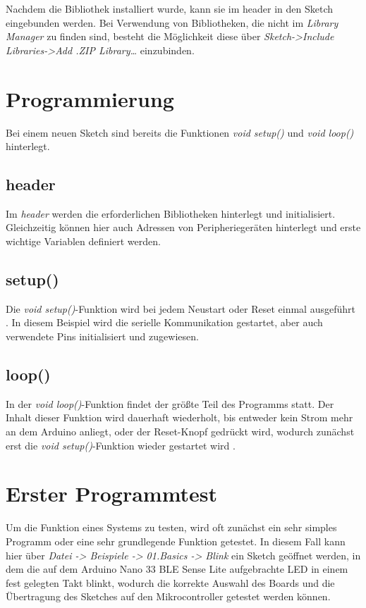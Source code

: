 Nachdem die Bibliothek installiert wurde, kann sie im header in den Sketch eingebunden werden.
Bei Verwendung von Bibliotheken, die nicht im \textit{Library Manager} zu finden sind, besteht die Möglichkeit diese über \textit{Sketch->Include Libraries->Add .ZIP Library…} einzubinden.

\section{Programmierung}
Bei einem neuen Sketch sind bereits die Funktionen \textit{void setup()} und \textit{void loop()} hinterlegt.

\subsection{header}
Im \textit{header} werden die erforderlichen Bibliotheken hinterlegt und initialisiert. Gleichzeitig können hier auch Adressen von Peripheriegeräten hinterlegt und erste wichtige Variablen definiert werden.

\subsection{setup()}
Die \textit{void setup()}-Funktion wird bei jedem Neustart oder Reset einmal ausgeführt \cite{ArdIDE.2024d}.
In diesem Beispiel wird die serielle Kommunikation gestartet, aber auch verwendete Pins initialisiert und zugewiesen.

\subsection{loop()}
In der \textit{void loop()}-Funktion findet der größte Teil des Programms statt. Der Inhalt dieser Funktion wird dauerhaft wiederholt, bis entweder kein Strom mehr an dem Arduino anliegt, oder der Reset-Knopf gedrückt wird, wodurch zunächst erst die \textit{void setup()}-Funktion wieder gestartet wird \cite{ArdIDE.2024e}.

\section{Erster Programmtest}\label{ersterprogrammtest}
Um die Funktion eines Systems zu testen, wird oft zunächst ein sehr simples Programm oder eine sehr grundlegende Funktion getestet.
In diesem Fall kann hier über \textit{Datei -> Beispiele -> 01.Basics -> Blink} ein Sketch geöffnet werden, in dem die auf dem Arduino Nano 33 BLE Sense Lite aufgebrachte LED in einem fest gelegten Takt blinkt, wodurch die korrekte Auswahl des Boards und die Übertragung des Sketches auf den Mikrocontroller getestet werden können.

